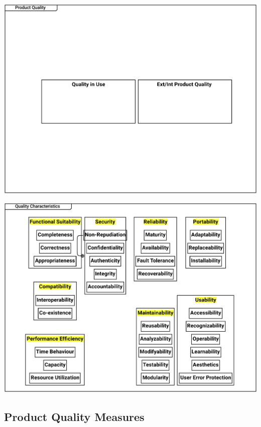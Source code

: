 \documentclass{article}
\begin{document}
\includegraphics[width= 1.0\linewidth]{quality_export/D0002_Product_Quality.pdf}


\includegraphics[width= 1.0\linewidth]{quality_export/D0004_Quality_Characteristics.pdf}


\subsection{Product Quality Measures}
\end{document}
